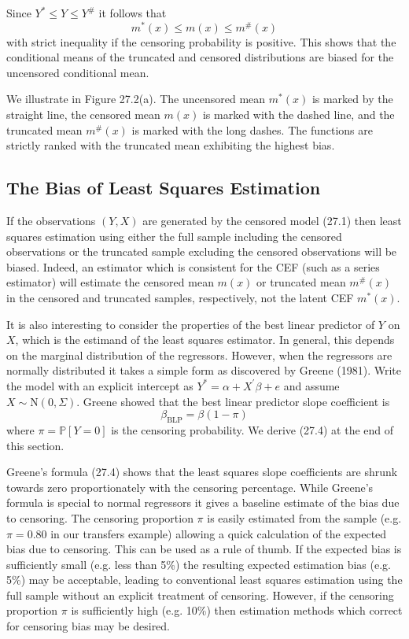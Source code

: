 \documentclass[10pt]{article}
\begin{document}
Since $Y^{*} \leq Y \leq Y^{\#}$ it follows that
$$
m^{*}(x) \leq m(x) \leq m^{\#}(x)
$$
with strict inequality if the censoring probability is positive. This shows that the conditional means of the truncated and censored distributions are biased for the uncensored conditional mean.

We illustrate in Figure 27.2(a). The uncensored mean $m^{*}(x)$ is marked by the straight line, the censored mean $m(x)$ is marked with the dashed line, and the truncated mean $m^{\#}(x)$ is marked with the long dashes. The functions are strictly ranked with the truncated mean exhibiting the highest bias.

\subsection{The Bias of Least Squares Estimation}
If the observations $(Y, X)$ are generated by the censored model (27.1) then least squares estimation using either the full sample including the censored observations or the truncated sample excluding the censored observations will be biased. Indeed, an estimator which is consistent for the CEF (such as a series estimator) will estimate the censored mean $m(x)$ or truncated mean $m^{\#}(x)$ in the censored and truncated samples, respectively, not the latent CEF $m^{*}(x)$.

It is also interesting to consider the properties of the best linear predictor of $Y$ on $X$, which is the estimand of the least squares estimator. In general, this depends on the marginal distribution of the regressors. However, when the regressors are normally distributed it takes a simple form as discovered by Greene (1981). Write the model with an explicit intercept as $Y^{*}=\alpha+X^{\prime} \beta+e$ and assume $X \sim \mathrm{N}(0, \Sigma)$. Greene showed that the best linear predictor slope coefficient is
$$
\beta_{\mathrm{BLP}}=\beta(1-\pi)
$$
where $\pi=\mathbb{P}[Y=0]$ is the censoring probability. We derive (27.4) at the end of this section.

Greene's formula (27.4) shows that the least squares slope coefficients are shrunk towards zero proportionately with the censoring percentage. While Greene's formula is special to normal regressors it gives a baseline estimate of the bias due to censoring. The censoring proportion $\pi$ is easily estimated from the sample (e.g. $\pi=0.80$ in our transfers example) allowing a quick calculation of the expected bias due to censoring. This can be used as a rule of thumb. If the expected bias is sufficiently small (e.g. less than 5\%) the resulting expected estimation bias (e.g. 5\%) may be acceptable, leading to conventional least squares estimation using the full sample without an explicit treatment of censoring. However, if the censoring proportion $\pi$ is sufficiently high (e.g. 10\%) then estimation methods which correct for censoring bias may be desired.
\end{document}
